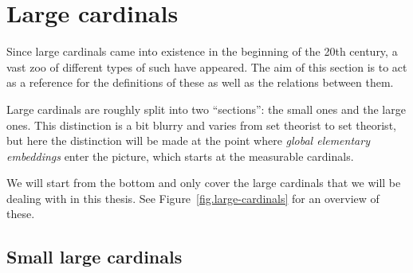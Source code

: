 \documentclass[../../main]{subfiles}
\begin{document}



\section{Large cardinals}
\label{prelims.large-cardinals}

Since large cardinals came into existence in the beginning of the 20th century, a vast zoo of different types of such have appeared. The aim of this section is to act as a reference for the definitions of these as well as the relations between them.

\qquad Large cardinals are roughly split into two ``sections'': the small ones and the large ones. This distinction is a bit blurry and varies from set theorist to set theorist, but here the distinction will be made at the point where \textit{global elementary embeddings} enter the picture, which starts at the measurable cardinals.

\qquad We will start from the bottom and only cover the large cardinals that we will be dealing with in this thesis. See Figure~\ref{fig.large-cardinals} for an overview of these.

\subsection{Small large cardinals}
\end{document}
